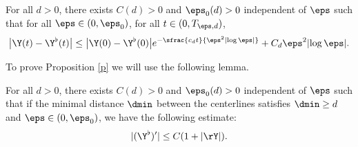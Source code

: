 \begin{Proposition}\label{p}
For all $d>0$, there exists $C(d)>0$ and $\eps_0(d)>0$ independent of $\eps$ such that for all $\eps\in(0,\eps_0)$,
for all $t \in (0,T_{\eps,d})$,
\begin{equation} \label{est:Z}
\bigl| \Y (t) - {\Y^\flat} (t)\bigr| \leq \bigl| \Y (0) - {\Y^\flat} (0)\bigr| e^{- \sfrac{c_d t}{\eps^2 \left|\log \eps\right|}} + C_d \eps^2 {\left|\log \eps\right|}.
\end{equation}
\end{Proposition}
To prove Proposition \ref{p} we will use the following lemma.
\begin{Lemma}\label{lemma-drift}
For all $d>0$, there exists $C(d)>0$ and $\eps_0(d)>0$ independent of $\eps$ such that if the minimal distance $\dmin$ between the centerlines satisfies $\dmin\geq d$ and $\eps\in(0,\eps_0)$, we have the following estimate:
\begin{equation} \label{est:s..2}
| (\Y^\flat)'| \leq C(1 + |\rY|).
\end{equation}
\end{Lemma}
